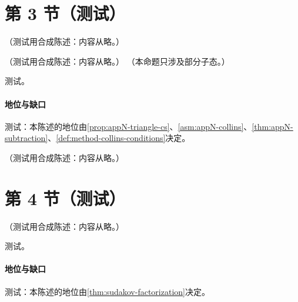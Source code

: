 \section{第 3 节（测试）}\label{sec:sudakov-factorization}

\begin{remark}\label{rem:sudakov-consistency}
（测试用合成陈述：内容从略。）
\end{remark}

\begin{theorem}\label{thm:sudakov-factorization}
（测试用合成陈述：内容从略。）
（本命题只涉及部分子态。）
\end{theorem}
\begin{proofsketch}测试。\end{proofsketch}
\paragraph{地位与缺口}测试：本陈述的地位由\cref{prop:appN-triangle-cs}、\cref{asm:appN-collins}、\cref{thm:appN-subtraction}、\cref{def:method-collins-conditions}决定。

\begin{definition}\label{def:sudakov-cusp}
（测试用合成陈述：内容从略。）
\end{definition}

\section{第 4 节（测试）}\label{sec:sudakov-evolution}

\begin{proposition}\label{prop:sudakov-kg}
（测试用合成陈述：内容从略。）
\end{proposition}
\begin{proofsketch}测试。\end{proofsketch}
\paragraph{地位与缺口}测试：本陈述的地位由\cref{thm:sudakov-factorization}决定。

